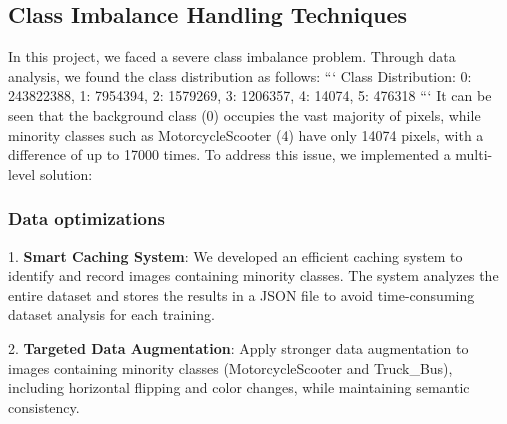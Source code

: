 \documentclass[conference]{IEEEtran}
\begin{document}

\subsection{Class Imbalance Handling Techniques}



In this project, we faced a severe class imbalance problem. Through data analysis, we found the class distribution as follows:
```
Class Distribution: {0: 243822388, 1: 7954394, 2: 1579269, 3: 1206357, 4: 14074, 5: 476318}
```
It can be seen that the background class (0) occupies the vast majority of pixels, while minority classes such as MotorcycleScooter (4) have only 14074 pixels, with a difference of up to 17000 times. To address this issue, we implemented a multi-level solution:


\subsubsection{Data optimizations}



1. \textbf{Smart Caching System}: We developed an efficient caching system to identify and record images containing minority classes. The system analyzes the entire dataset and stores the results in a JSON file to avoid time-consuming dataset analysis for each training.

2. \textbf{Targeted Data Augmentation}: Apply stronger data augmentation to images containing minority classes (MotorcycleScooter and Truck\_Bus), including horizontal flipping and color changes, while maintaining semantic consistency.
\end{document}
